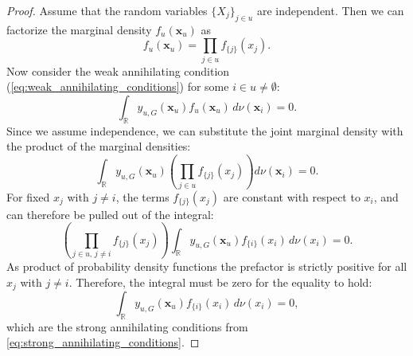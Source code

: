 \begin{proof}
Assume that the random variables $\{X_j\}_{j \in u}$ are independent. Then we can factorize the marginal density $f_u(\boldsymbol{x}_u)$ as
\[
f_u(\boldsymbol{x}_u) = \prod_{j \in u} f_{\{j\}}(x_j).
\]
Now consider the weak annihilating condition (\autoref{eq:weak_annihilating_conditions}) for some $i \in u \neq \emptyset$:
\[
\int_{\mathbb{R}} y_{u,G}(\boldsymbol{x}_u) f_u(\boldsymbol{x}_u) \, d \nu(\boldsymbol{x}_i) = 0.
\]
Since we assume independence, we can substitute the joint marginal density with the product of the marginal densities:
\[
\int_{\mathbb{R}} y_{u,G}(\boldsymbol{x}_u) \left( \prod_{j \in u} f_{{\{j\}}}(x_j) \right) d \nu(\boldsymbol{x}_i) = 0.
\]
For fixed $x_j$ with $j \ne i$, the terms $f_{{\{j\}}}(x_j)$ are constant with respect to $x_i$, and can therefore be pulled out of the integral:
\[
\left( \prod_{j \in u,\, j \ne i} f_{{\{j\}}}(x_j) \right) \int_{\mathbb{R}} y_{u,G}(\boldsymbol{x}_u) f_{{\{i\}}}(x_i) \, d \nu(x_i) = 0.
\]
As product of probability density functions the prefactor is strictly positive for all $x_j$ with $j \ne i$. Therefore, the integral must be zero for the equality to hold:
\[
\int_{\mathbb{R}} y_{u,G}(\boldsymbol{x}_u) f_{{\{i\}}}(x_i) \, d \nu(x_i) = 0,
\]
which are the strong annihilating conditions from \autoref{eq:strong_annihilating_conditions}.
\end{proof}


